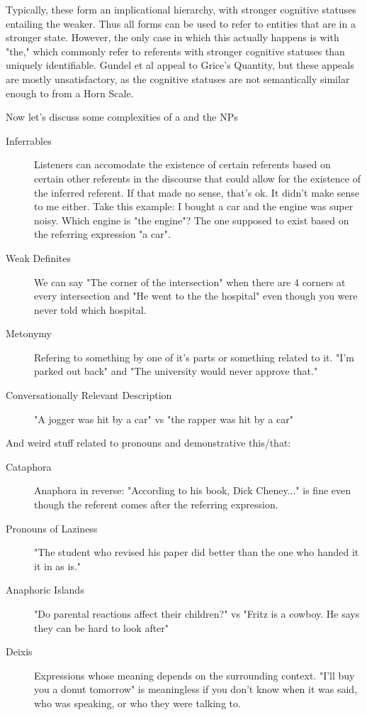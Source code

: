 \documentclass[11pt]{article}
\begin{document}
Typically, these form an implicational hierarchy, with stronger cognitive statuses entailing the weaker. Thus
all forms can be used to refer to entities that are in a stronger state. However, the only case in which this
actually happens is with "the," which commonly refer to referents with stronger cognitive statuses than
uniquely identifiable. Gundel et al appeal to Grice's Quantity, but these appeals are mostly unsatisfactory, 
as the cognitive statuses are not semantically similar enough to from a Horn Scale.

Now let's discuss some complexities of a and the NPs
\begin{description}
    \item[Inferrables] Listeners can accomodate the existence of certain referents based on certain other
        referents in the discourse that could allow for  the existence of the inferred referent. If that 
        made no sense, that's ok. It didn't make sense to me either. Take this example: I bought a car
        and the engine was super noisy. Which engine is "the engine"? The one supposed to exist based
        on the referring expression "a car".
    \item[Weak Definites] We can say "The corner of the intersection" when there are 4 corners at every
        intersection and "He went to the the hospital" even though you were never told which hospital.
    \item[Metonymy] Refering to something by one of it's parts or something related to it. "I'm parked
        out back" and "The university would never approve that."
    \item[Conversationally Relevant Description] "A jogger was hit by a car" vs "the rapper was hit by a
        car"
\end{description}

And weird stuff related to pronouns and demonstrative this/that:

\begin{description}
    \item[Cataphora] Anaphora in reverse: "According to his book, Dick Cheney..." is fine even though
        the referent comes after the referring expression.
    \item[Pronouns of Laziness] "The student who revised his paper did better than the one who handed it 
        it in as is." 
    \item[Anaphoric Islands] "Do parental reactions affect their children?" vs "Fritz is a cowboy. He 
        says they can be hard to look after"
    \item[Deixis] Expressions whose meaning depends on the surrounding context. "I'll buy you a donut
        tomorrow" is meaningless if you don't know when it was said, who was speaking, or who they 
        were talking to. 
\end{description}
\end{document}
